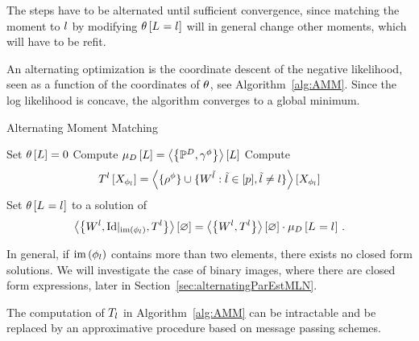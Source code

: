 The steps have to be alternated until sufficient convergence, since matching the moment to $l$ by modifying $\theta\left[L_{}=l_{}\right]$ will in general change other moments, which will have to be refit.


An alternating optimization is the coordinate descent of the negative likelihood, seen as a function of the coordinates of $\theta$, see Algorithm~\ref{alg:AMM}.
Since the log likelihood is concave, the algorithm converges to a global minimum.





\begin{algorithm}[h!]
\caption{Alternating Moment Matching}\label{alg:AMM}
\begin{algorithmic}
\State Set $\theta\left[L\right]=0$
\State Compute $\mu_{D}\left[L\right]= \left\langle \left\{\mathbb{P}^{D},\gamma^{\phi}\right\}\right\rangle \left[ L \right]$
{}
\For{$\statenumeratorin$}
	\State Compute 
		\begin{align*}
			T^{l}\left[X_{\phi_l}\right] 
			= \left\langle \{\rho^{\phi}\}\cup\{W^{\tilde{l}} : \tilde{l} \in [p], \tilde{l}\neq l\}\right\rangle \left[ X_{\phi_l} \right] 
		\end{align*}
	\State Set $\theta\left[L_{}=l_{}\right]$ to a solution of 
	\begin{align*}
		\left\langle \left\{W^{l},{\mathrm{Id}}|_{\mathrm{im}\left(\phi_l\right)},T^{l}\right\}\right\rangle \left[ \varnothing \right]
		= \left\langle \left\{W^{l},T^{l}\right\}\right\rangle \left[ \varnothing \right] \cdot \mu_{D}\left[L_{}=l_{}\right] \, . 
	\end{align*}
\EndFor
\EndWhile
\end{algorithmic}
\end{algorithm}


% 
In general, if $\mathrm{im}\left(\phi_l\right)$ contains more than two elements, there exists no closed form solutions.
We will investigate the case of binary images, where there are closed form expressions, later in Section~\ref{sec:alternatingParEstMLN}.


%
The computation of $T_l$ in Algorithm~\ref{alg:AMM} can be intractable and be replaced by an approximative procedure based on message passing schemes.


